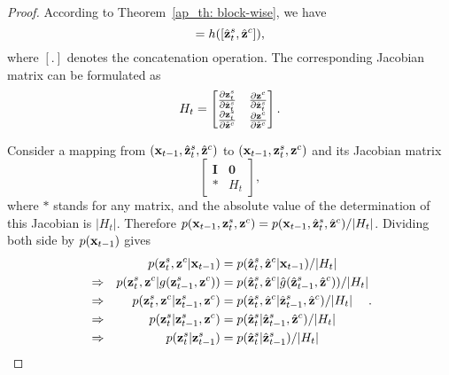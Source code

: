\begin{proof}
    According to Theorem~\ref{ap_th: block-wise}, we have
    \begin{equation}
         [\rvz_t^s,\rvz^c] = h([\hat\rvz_t^s,\hat\rvz^c]),
    \end{equation}
    where $[.]$ denotes the concatenation operation.  The corresponding Jacobian matrix can be formulated as \begin{equation}
        H_t = \begin{bmatrix}
            \frac{\partial {\mathbf{z}}_t^s}{\partial \hat{{\mathbf{z}}}_t^s} &
            \frac{\partial {\mathbf{z}}^c}{\partial \hat{{\mathbf{z}}}_t^s} \\
            \frac{\partial {\mathbf{z}}_t^s}{\partial \hat{{\mathbf{z}}}^c} &
            \frac{\partial {\mathbf{z}}^c}{\partial \hat{{\mathbf{z}}}^c}
        \end{bmatrix}.
    \end{equation}

    Consider a mapping from $({\mathbf{x}}_{t-1}, \hat{{\mathbf{z}}}_t^s, \hat{{\mathbf{z}}}^c)$ to $({\mathbf{x}}_{t-1}, {\mathbf{z}}_t^s, {\mathbf{z}}^c)$ and its Jacobian matrix
    \begin{equation}
        \begin{bmatrix}
        \mathbf{I} & \mathbf{0} \\
        \mathbf{*} & H_t
        \end{bmatrix},
    \end{equation}
    where $*$ stands for any matrix, and the absolute value of the determination of this Jacobian is $|H_t|$. Therefore $p({\mathbf{x}}_{t-1}, {\mathbf{z}}_t^s, {\mathbf{z}}^c) = p({\mathbf{x}}_{t-1}, \hat{{\mathbf{z}}}_t^s, \hat{{\mathbf{z}}}^c)/ |H_t|$. Dividing both side by $p({\mathbf{x}}_{t-1})$ gives
    \begin{equation}
    \begin{aligned}
        &&
        p({\mathbf{z}}_t^s, {\mathbf{z}}^c|{\mathbf{x}}_{t-1}) 
        & = 
        p(\hat{{\mathbf{z}}}_t^s, \hat{{\mathbf{z}}}^c|{\mathbf{x}}_{t-1})
        / |H_t| \\
        &\Rightarrow&
        p({\mathbf{z}}_t^s, {\mathbf{z}}^c|g({\mathbf{z}}_{t-1}^s, {\mathbf{z}}^c))  
        & = 
        p(\hat{{\mathbf{z}}}_t^s, \hat{{\mathbf{z}}}^c|\hat{g}(\hat{{\mathbf{z}}}_{t-1}^s, \hat{{\mathbf{z}}}^c))
        / |H_t| 
        \\
        &\Rightarrow&
        p({\mathbf{z}}_t^s, {\mathbf{z}}^c|{\mathbf{z}}_{t-1}^s, {\mathbf{z}}^c)  
        & = 
        p(\hat{{\mathbf{z}}}_t^s, \hat{{\mathbf{z}}}^c|\hat{{\mathbf{z}}}_{t-1}^s, \hat{{\mathbf{z}}}^c)
        / |H_t| 
        \\
        &\Rightarrow&
        p({\mathbf{z}}_t^s|{\mathbf{z}}_{t-1}^s, {\mathbf{z}}^c)  
        & = 
        p(\hat{{\mathbf{z}}}_t^s|\hat{{\mathbf{z}}}_{t-1}^s, \hat{{\mathbf{z}}}^c)
        / |H_t| 
        \\
        &\Rightarrow&
        p({\mathbf{z}}_t^s|{\mathbf{z}}_{t-1}^s)  
        & = 
        p(\hat{{\mathbf{z}}}_t^s|\hat{{\mathbf{z}}}_{t-1}^s)
        / |H_t| 
        \\
    \end{aligned}.
    \end{equation}
    

\end{proof}
